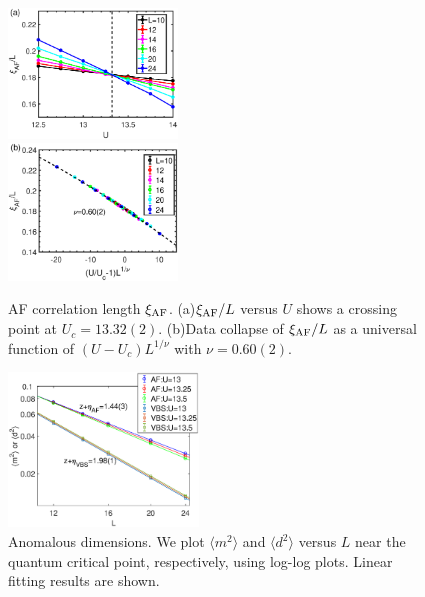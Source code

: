 \documentclass[twocolumn,superscriptaddress]{revtex4-1}
\begin{document}
\begin{figure}
    \includegraphics[width=0.4\textwidth]{correlationlength_af}\\
    \includegraphics[width=0.4\textwidth]{datacollapse_xi}
    \caption{\label{fig:correlationlength_af} AF correlation length $\xi_{\rm AF}$. (a)$\xi_{\rm AF}/L$ versus $U$ shows a crossing point at $U_c=13.32(2)$. (b)Data collapse of $\xi_{\rm AF}/L$ as a universal function of $(U-U_c)L^{1/\nu}$ with $\nu=0.60(2)$.}
\end{figure}

\begin{figure}
    \includegraphics[width=0.45\textwidth]{etaexponent}
    \caption{\label{fig:etaexponent}Anomalous dimensions. We plot $\langle m^2 \rangle$ and $\langle d^2 \rangle$ versus $L$ near the quantum critical point, respectively, using log-log plots. Linear fitting results are shown. }
\end{figure}
\end{document}
